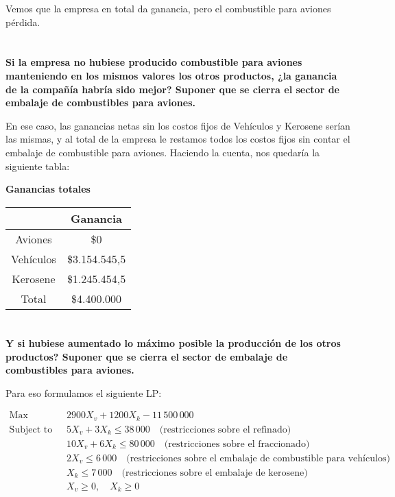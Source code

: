 \documentclass[10pt,a4paper]{article}
\begin{document}
Vemos que la empresa en total da ganancia, pero el combustible para aviones pérdida.
\section{}
\textbf{Si la empresa no hubiese producido combustible para aviones manteniendo en los mismos valores los otros productos, ¿la ganancia de la compañía habría sido mejor? Suponer que se cierra el sector de embalaje de combustibles para aviones.}

En ese caso, las ganancias netas sin los costos fijos de Vehículos y Kerosene serían las mismas, y al total de la empresa le restamos todos los costos fijos sin contar el embalaje de combustible para aviones. Haciendo la cuenta, nos quedaría la siguiente tabla:

\begin{center}
	\textbf{Ganancias totales}
	
	\begin{tabular}{| c | c |}
		\hline
		&           Ganancia    \\
		\hline
		Aviones   & \$0  \\
		\hline
		Vehículos & \$3.154.545,5 \\
		\hline
		Kerosene  & \$1.245.454,5 \\
		\hline
		Total     & \$4.400.000\\
		\hline
	\end{tabular}
\end{center}

\section{}
\textbf{Y si hubiese aumentado lo máximo posible la producción de los otros productos? Suponer que se cierra el
	sector de embalaje de combustibles para aviones.}

Para eso formulamos el siguiente LP:

\begin{align*}
	\text{Max} \quad & 2900 X_v + 1200 X_k - 11\,500\,000 \\
	\text{Subject to} \quad
	& 5 X_v + 3 X_k \leq 38\,000 \quad \text{(restricciones sobre el refinado)} \\
	& 10 X_v + 6 X_k \leq 80\,000 \quad \text{(restricciones sobre el fraccionado)} \\
	& 2 X_v \leq 6\,000  \quad \text{(restricciones sobre el embalaje de combustible para vehículos)}\\
	& X_k \leq 7\,000  \quad \text{(restricciones sobre el embalaje de kerosene)}\\
	& X_v \geq 0,\quad X_k \geq 0
\end{align*}
\end{document}
